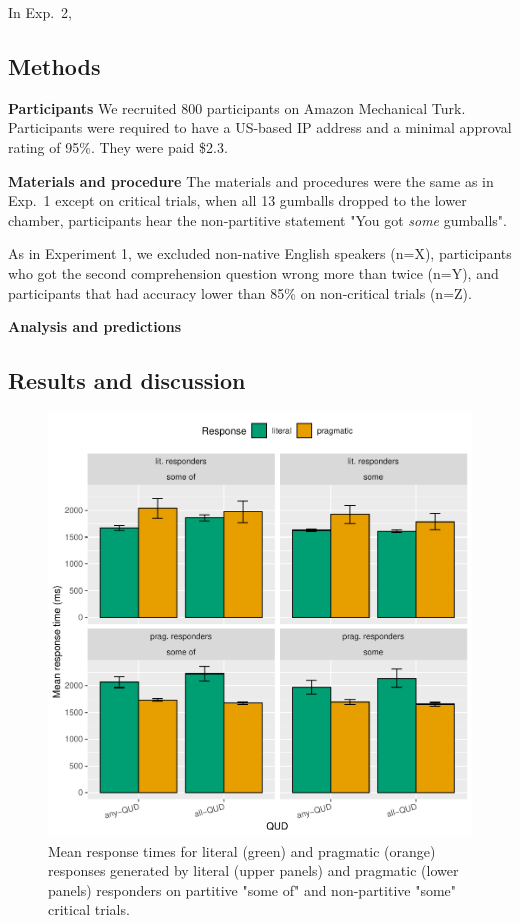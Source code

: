 \documentclass[10pt,letterpaper]{article}
\begin{document}
In Exp.~2, 

\subsection{Methods}

\noindent \textbf{Participants} We recruited 800 participants on Amazon Mechanical Turk. Participants were required to have a US-based IP address and a minimal approval rating of 95\%. They were paid \$2.3.

\noindent \textbf{Materials and procedure} The materials and procedures were the same as in Exp.~1 except on critical trials, when all 13 gumballs dropped to the lower chamber, participants hear the non-partitive statement "You got \textit{some} gumballs".

As in Experiment 1, we excluded non-native English speakers (n=X), participants who got the second comprehension question wrong more than twice (n=Y), and participants that had accuracy lower than 85\% on non-critical trials (n=Z).

\noindent \textbf{Analysis and predictions}

\subsection{Results and discussion}

\begin{figure}
  \includegraphics[width=\columnwidth]{plots/responsetimes.pdf}
  \caption{Mean response times for literal (green) and pragmatic (orange) responses generated by literal (upper panels) and pragmatic (lower panels) responders on partitive "some of" and non-partitive "some" critical trials. \label{fig:responsetimes}}
\end{figure}
\end{document}
